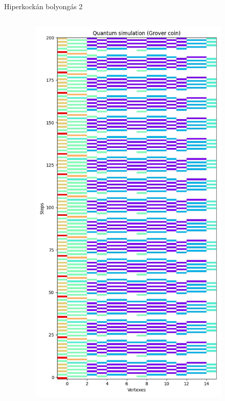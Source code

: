 \documentclass[aspectratio=169]{beamer}
\begin{document}
\begin{frame}{Hiperkockán bolyongás 2}

  \begin{columns}[onlytextwidth]
    \begin{column}{.25\textwidth}
    \end{column}
    \begin{column}{.25\textwidth}
      \begin{figure}
        \includegraphics[width=0.9\textwidth]{./tdk_figures/results/hypercube/grover.jpg}

\end{figure}
\end{column}
\end{columns}
\end{frame}
\end{document}
